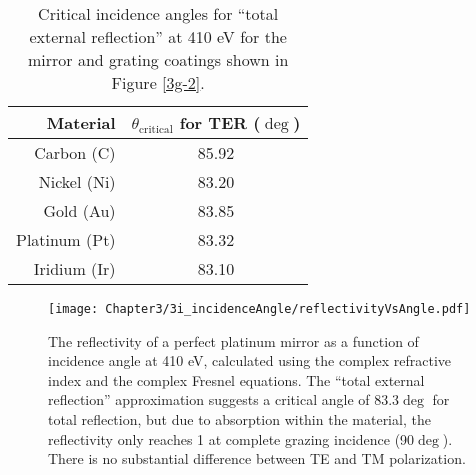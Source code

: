 \begin{table}[p]
   \centering
   \caption{Critical incidence angles for ``total external reflection'' at 410 eV for the mirror and grating coatings shown in Figure \ref{3g-2}.}
   \begin{tabular}{@{} r c @{}} %
      \hline
        Material    & $\theta_{\mathrm{critical}}$ for TER ($\deg$)\\
      \hline \hline
Carbon (C) & 85.92\\
Nickel (Ni) & 83.20\\
Gold (Au)& 83.85\\
Platinum (Pt)& 83.32\\
Iridium (Ir)& 83.10\\
      \hline
   \end{tabular}
   \label{3i-2}
\end{table}

\begin{figure}[p] %
   \centering
   \texttt{[image: Chapter3/3i\_incidenceAngle/reflectivityVsAngle.pdf]} 
   \caption[The reflectivity of a perfect platinum mirror as a function of incidence angle at 410 eV, calculated using the complex refractive index and the complex Fresnel equations.]{The reflectivity of a perfect platinum mirror as a function of incidence angle at 410 eV, calculated using the complex refractive index and the complex Fresnel equations.  The ``total external reflection'' approximation suggests a critical angle of 83.3$\deg$ for total reflection, but due to absorption within the material, the reflectivity only reaches 1 at complete grazing incidence (90$\deg$).  There is no substantial difference between TE and TM polarization.}
   \label{reflectionVsAngle}
\end{figure}

